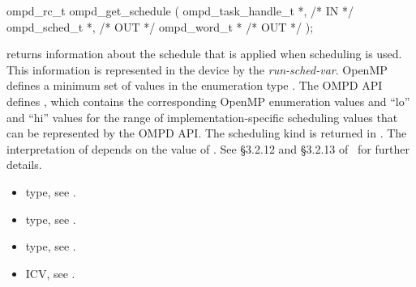 %	
%	

%
\summary

\format
\cspecificstart
\begin{boxedcode}
ompd\_rc\_t ompd\_get\_schedule (
  ompd\_task\_handle\_t        *,                           /* IN */
  ompd\_sched\_t              *,                                 /* OUT */
  ompd\_word\_t              *                              /* OUT */
); 
\end{boxedcode}
\cspecificend

\descr

 returns information about the schedule that is
applied when  scheduling is used.
%
This information is represented in the device by the
\emph{run-sched-var}.
\argdesc
OpenMP defines a minimum set of values in the enumeration type
.
%
The OMPD API defines
, which contains the
corresponding OpenMP enumeration values and ``lo'' and ``hi'' values
for the range of implementation-specific scheduling values that can be
represented by the OMPD API.
%
The scheduling kind is returned in .
%
The interpretation of  depends on the value of
.
%
See \S3.2.12 and \S3.2.13 of~\cite{OpenMP} for further details.

\crossreferences
\begin{itemize}
	\item {} type, see .
	\item {} type, see .
	\item {} type, see .
	\item {} ICV, see .
\end{itemize}


